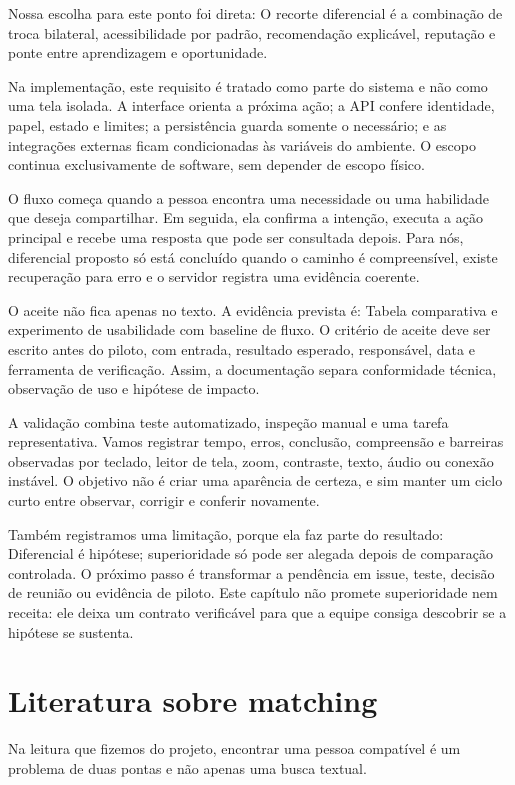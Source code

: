 \documentclass[12pt,oneside,a4paper,article]{abntex2}
\begin{document}
Nossa escolha para este ponto foi direta: O recorte diferencial é a combinação de troca bilateral, acessibilidade por padrão, recomendação explicável, reputação e ponte entre aprendizagem e oportunidade.

Na implementação, este requisito é tratado como parte do sistema e não como uma tela isolada. A interface orienta a próxima ação; a API confere identidade, papel, estado e limites; a persistência guarda somente o necessário; e as integrações externas ficam condicionadas às variáveis do ambiente. O escopo continua exclusivamente de software, sem depender de escopo físico.

O fluxo começa quando a pessoa encontra uma necessidade ou uma habilidade que deseja compartilhar. Em seguida, ela confirma a intenção, executa a ação principal e recebe uma resposta que pode ser consultada depois. Para nós, diferencial proposto só está concluído quando o caminho é compreensível, existe recuperação para erro e o servidor registra uma evidência coerente.

O aceite não fica apenas no texto. A evidência prevista é: Tabela comparativa e experimento de usabilidade com baseline de fluxo. O critério de aceite deve ser escrito antes do piloto, com entrada, resultado esperado, responsável, data e ferramenta de verificação. Assim, a documentação separa conformidade técnica, observação de uso e hipótese de impacto.

A validação combina teste automatizado, inspeção manual e uma tarefa representativa. Vamos registrar tempo, erros, conclusão, compreensão e barreiras observadas por teclado, leitor de tela, zoom, contraste, texto, áudio ou conexão instável. O objetivo não é criar uma aparência de certeza, e sim manter um ciclo curto entre observar, corrigir e conferir novamente.

Também registramos uma limitação, porque ela faz parte do resultado: Diferencial é hipótese; superioridade só pode ser alegada depois de comparação controlada. O próximo passo é transformar a pendência em issue, teste, decisão de reunião ou evidência de piloto. Este capítulo não promete superioridade nem receita: ele deixa um contrato verificável para que a equipe consiga descobrir se a hipótese se sustenta.

\section{Literatura sobre matching}
Na leitura que fizemos do projeto, encontrar uma pessoa compatível é um problema de duas pontas e não apenas uma busca textual.
\end{document}
